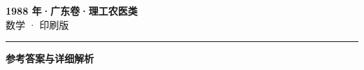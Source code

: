 \documentclass[zihao=5, a4paper]{ctexart}
\begin{document}
\begin{center}
  {\Large\bfseries 1988 年·广东卷·理工农医类}\\[4pt]
  {\large 数学 · 印刷版}
\end{center}
\medskip
{}

\par\bigskip\hrule\bigskip
{}
\begin{center}{\large\bfseries 参考答案与详细解析}\end{center}
\smallskip

\end{document}
